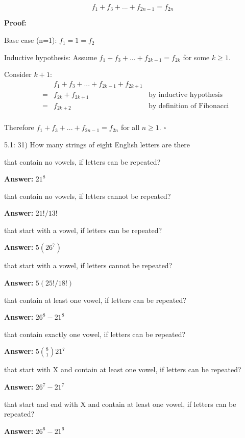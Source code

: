 \documentclass{article}
\newenvironment{proof}
{\color{PineGreen}\begin{list}{}%
         {\setlength{\leftmargin}{1cm}}%
         \item[]%
        \textbf{Proof:}
        
        }
{ $\square$\end{list}}
\newenvironment{answer}
{\color{PineGreen}\begin{list}{}%
         {\setlength{\leftmargin}{1cm}}%
         \item[]%
        \textbf{Answer: }}
{\end{list}}
\begin{document}
\[
f_1 + f_3 + ... + f_{2n-1} = f_{2n}
\]

\begin{proof}
Base case (n=1):
$f_1 = 1 = f_2$

Inductive hypothesis:
Assume $f_1 + f_3 + ... + f_{2k-1} = f_{2k}$ for some $k \geq 1$.

Consider $k+1$:
\[\begin{array}{rclr}
&& f_1 + f_3 + ... + f_{2k-1} + f_{2k+1}& \\
&=& f_{2k} + f_{2k+1} & \textrm{by inductive hypothesis} \\
&=& f_{2k+2} & \textrm{by definition of Fibonacci} \\
\end{array}\]

Therefore $f_1 + f_3 + ... + f_{2n-1} = f_{2n}$ for all $n \geq 1$.\end{proof}

5.1: 31) How many strings of eight English letters are there

\begin{enumerate}[label=\alph{enumi})]
\item that contain no vowels, if letters can be repeated?
\begin{answer}$ 21^8 $\end{answer}
\item that contain no vowels, if letters cannot be repeated?
\begin{answer}$ 21!/13! $\end{answer}
\item that start with a vowel, if letters can be repeated?
\begin{answer}$ 5(26^7) $\end{answer}
\item that start with a vowel, if letters cannot be repeated?
\begin{answer}$ 5(25!/18!) $\end{answer}
\item that contain at least one vowel, if letters can be repeated?
\begin{answer}$ 26^8 - 21^8 $\end{answer}
\item that contain exactly one vowel, if letters can be repeated?
\begin{answer}$ 5 {8 \choose 1} 21^7 $\end{answer}
\item that start with X and contain at least one vowel, if letters can be repeated?
\begin{answer}$ 26^7 - 21^7$\end{answer}
\item that start and end with X and contain at least one vowel, if
  letters can be repeated?
\begin{answer}$ 26^6 - 21^6$\end{answer}
\end{enumerate}
\end{document}
